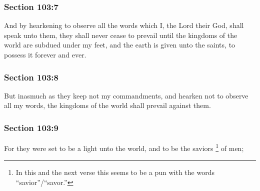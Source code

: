 	\subsubsection{Section 103:7} %
		\label{DC103-7}

		And by hearkening to observe all the words which I, the Lord their God, shall speak unto them, they shall never cease to prevail until the kingdoms of the world are subdued under my feet, and the earth is given unto the saints, to possess it forever and ever.


	\subsubsection{Section 103:8} %
		\label{DC103-8}

		But inasmuch as they keep not my commandments, and hearken not to observe all my words, the kingdoms of the world shall prevail against them.


	\subsubsection{Section 103:9} %
		\label{DC103-9}

		For they were set to be a light unto the world, and to be the saviors%
			\footnote{%
				In this and the next verse this seems to be a pun with the words ``savior''/``savor.''
				}
		of men;


